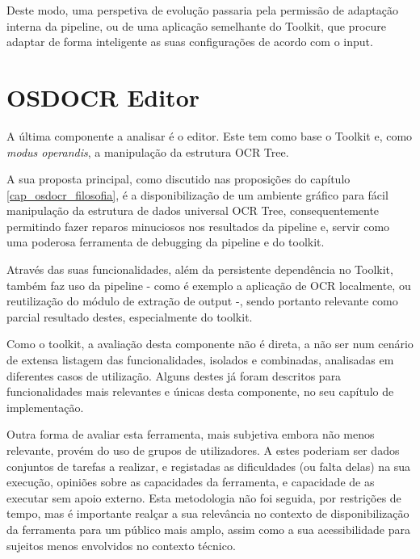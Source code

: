 Deste modo, uma perspetiva de evolução passaria pela permissão de adaptação interna da pipeline, ou de uma aplicação semelhante do Toolkit, que procure adaptar de forma inteligente as suas configurações de acordo com o input.






\section{OSDOCR Editor}


A última componente a analisar é o editor. Este tem como base o Toolkit e, como \textit{modus operandis}, a manipulação da estrutura OCR Tree. 

A sua proposta principal, como discutido nas proposições do capítulo \ref{cap_osdocr_filosofia}, é a disponibilização de um ambiente gráfico para fácil manipulação da estrutura de dados universal OCR Tree, consequentemente permitindo fazer reparos minuciosos nos resultados da pipeline e, servir como uma poderosa ferramenta de debugging da pipeline e do toolkit.

Através das suas funcionalidades, além da persistente dependência no Toolkit, também faz uso da pipeline - como é exemplo a aplicação de OCR localmente, ou reutilização do módulo de extração de output -, sendo portanto relevante como parcial resultado destes, especialmente do toolkit.

Como o toolkit, a avaliação desta componente não é direta, a não ser num cenário de extensa listagem das funcionalidades, isolados e combinadas, analisadas em diferentes casos de utilização. Alguns destes já foram descritos para funcionalidades mais relevantes e únicas desta componente, no seu capítulo de implementação. 

Outra forma de avaliar esta ferramenta, mais subjetiva embora não menos relevante, provém do uso de grupos de utilizadores. A estes poderiam ser dados conjuntos de tarefas a realizar, e registadas as dificuldades (ou falta delas) na sua execução, opiniões sobre as capacidades da ferramenta, e capacidade de as executar sem apoio externo. Esta metodologia não foi seguida, por restrições de tempo, mas é importante realçar a sua relevância no contexto de disponibilização da ferramenta para um público mais amplo, assim como a sua acessibilidade para sujeitos menos envolvidos no contexto técnico.

